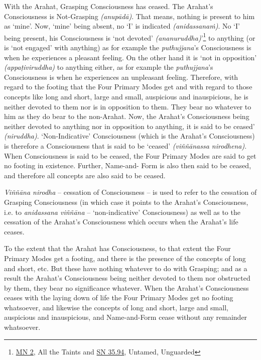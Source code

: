 With the Arahat, Grasping Consciousness has ceased. The Arahat's Consciousness is Not-Grasping \emph{(anupādā)}. That means, nothing is present to him as `mine'. Now, `mine' being absent, no `I' is indicated \emph{(anidassanaṁ)}. No `I' being present, his Consciousness is `not devoted' \emph{(ananuruddha)}'\footnote{\href{https://suttacentral.net/mn2/en/bodhi}{MN 2}, All the Taints and \href{https://suttacentral.net/sn35.94/en/bodhi}{SN 35.94}, Untamed, Unguarded} to anything (or is `not engaged' with anything) as for example the \emph{puthujjana}'s Consciousness is when he experiences a pleasant feeling. On the other hand it is `not in opposition' \emph{(appaṭiviruddha)} to anything either, as for example the \emph{puthujjana}'s Consciousness is when he experiences an unpleasant feeling. Therefore, with regard to the footing that the Four Primary Modes get and with regard to those concepts like long and short, large and small, auspicious and inauspicious, he is neither devoted to them nor is in opposition to them. They bear no  whatever to him as they do bear to the non-Arahat. Now, the Arahat's Consciousness being neither devoted to anything nor in opposition to anything, it is said to be ceased' \emph{(niruddha)}. `Non-Indicative' Consciousness (which is the Arahat's Consciousness) is therefore a Consciousness that is said to be `ceased' \emph{(viññānassa nirodhena)}. When Consciousness is said to be ceased, the Four Primary Modes are said to get no footing in existence. Further, Name-and- Form is also then said to be ceased, and therefore all concepts are also said to be ceased.

\emph{Viññāna nirodha} -- cessation of Consciousness -- is used to refer to the cessation of Grasping Consciousness (in which case it points to the Arahat's Consciousness, i.e. to \emph{anidassana viññāna} -- `non-indicative' Consciousness) as well as to the cessation of the Arahat's Consciousness which occurs when the Arahat's life ceases.

To the extent that the Arahat has Consciousness, to that extent the Four Primary Modes get a footing, and there is the presence of the concepts of long and short, etc. But these have nothing whatever to do with Grasping; and as a result the Arahat's Consciousness being neither devoted to them nor obstructed by them, they bear no significance whatever. When the Arahat's Consciousness ceases with the laying down of life the Four Primary Modes get no footing whatsoever, and likewise the concepts of long and short, large and small, auspicious and inauspicious, and Name-and-Form cease without any remainder whatsoever.

